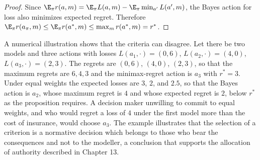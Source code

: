 \begin{proof}
Since $\E_\pi r(a,m)=\E_\pi L(a,m)-\E_\pi\min_{a'}L(a',m)$, the Bayes action for loss also minimizes expected regret. Therefore $\E_\pi r(a_\pi,m)\le\E_\pi r(a^\ast,m)\le\max_mr(a^\ast,m)=r^\ast$.
\end{proof}

A numerical illustration shows that the criteria can disagree. Let there be two models and three actions with losses $L(a_1,\cdot)=(0,6)$, $L(a_2,\cdot)=(4,0)$, $L(a_3,\cdot)=(2,3)$. The regrets are $(0,6)$, $(4,0)$, $(2,3)$, so that the maximum regrets are $6,4,3$ and the minimax-regret action is $a_3$ with $r^\ast=3$. Under equal weights the expected losses are $3$, $2$, and $2.5$, so that the Bayes action is $a_2$, whose maximum regret is $4$ and whose expected regret is $2$, below $r^\ast$ as the proposition requires. A decision maker unwilling to commit to equal weights, and who would regret a loss of $4$ under the first model more than the cost of insurance, would choose $a_3$. The example illustrates that the selection of a criterion is a normative decision which belongs to those who bear the consequences and not to the modeller, a conclusion that supports the allocation of authority described in Chapter 13.
